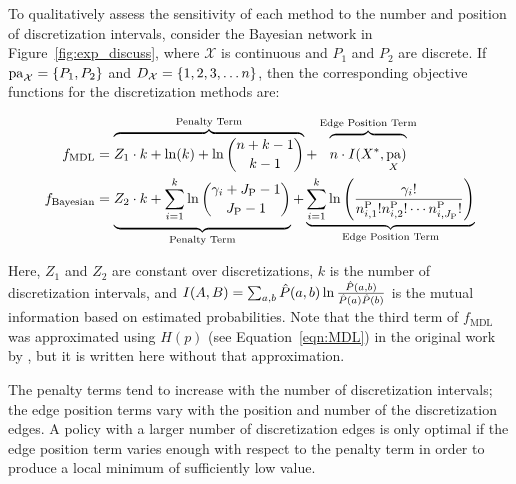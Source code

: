 \documentclass[twoside,11pt]{article}
\newcommand{\citet}[1]{\citeauthor{#1} \citeyear{#1}}
\newcommand{\paren}[1]{\mathopen{}\mathclose\bgroup\left(#1\aftergroup\egroup\right)}
\newcommand{\curly}[1]{\mathopen{}\mathclose\bgroup\left\{#1\aftergroup\egroup\right\}}
\DeclareMathOperator{\Pa}{pa} %
\newcommand{\cX}{\mathcal{X}} %
\begin{document}
To qualitatively assess the sensitivity of each method to the number and position of discretization intervals, consider the Bayesian network in Figure~\ref{fig:exp_discuss}, where $\cX$ is continuous and $P_1$ and $P_2$ are discrete.
If $\Pa_{\cX} = \curly{P_1, P_2}$ and $D_{\cX} = \curly{1,2,3, \ldots n}$, then the corresponding objective functions for the discretization methods are:
\begin{small}
  \begin{equation}
  \begin{aligned}
  f_{\text{MDL}} & = \overbrace{Z_1 \cdot k + \ln(k) + \ln {{n +k - 1}\choose{k -1}} }^{\text{Penalty Term}}+   \overbrace{\rule{0pt}{1.35em} n \cdot I(X^*, \Pa_X)}^{\text{Edge Position Term}} \\
  f_{\text{Bayesian}} &= \underbrace{{\vrule width0pt height0pt depth1.48em\relax}  Z_2 \cdot k + \sum_{i=1}^k \ln {{\gamma_i + J_\text{P} - 1}\choose{J_\text{P} -1}}}_{\text{Penalty Term}} + \underbrace{\sum^k_{i=1} \ln \left(   {{\gamma_i !}\over{n^{\text{P}}_{i,1}! n^{\text{P}}_{i,2}! \cdots n^{\text{P}}_{i,J_\text{P}}!    }} \right) }_{\text{Edge Position Term}}
  \end{aligned}
  \end{equation}
\end{small}

Here, $Z_1$ and $Z_2$ are constant over discretizations, $k$ is the number of discretization intervals, and $I\paren{A, B} = \sum_{a,b} \hat{P}(a,b) \ln\frac{\hat{P}(a,b)}{\hat{P}(a)\hat{P}(b)}$ is the mutual information based on estimated probabilities.
Note that the third term of $f_\text{MDL}$ was approximated using $H(p)$ (see Equation~\ref{eqn:MDL}) in the original work by \citet{Friedman_1996}, but it is written here without that approximation.

The penalty terms tend to increase with the number of discretization intervals; the edge position terms vary with the position and number of the discretization edges.
A policy with a larger number of discretization edges is only optimal if the edge position term varies enough with respect to the penalty term in order to produce a local minimum of sufficiently low value.
\end{document}
